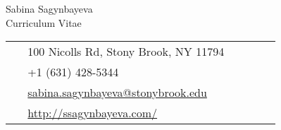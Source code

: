 \documentclass[10pt]{article} %
\begin{document}
\begin{paracol}{2}

\parbox[top][0.12\textheight][c]{\linewidth}{ %
	\vspace{-0.04\textheight} %
	\centering %
	{\sffamily\Huge Sabina Sagynbayeva}\\\medskip %
	{\Huge\color{headings}\cvtextfont Curriculum Vitae}
}
\switchcolumn %

\parbox[top][0.12\textheight][c]{\linewidth}{ %
	\vspace{-0.04\textheight} %
	\colorbox{shade}{ %
		\begin{supertabular}{p{0.05\linewidth}|p{0.775\linewidth}} %
			\raisebox{-1pt}{\faHome} & 100 Nicolls Rd, Stony Brook, NY 11794 \\ %
			\raisebox{-1pt}{\faPhone} & +1 (631) 428-5344 \\ %
			\raisebox{0pt}{\small\faEnvelope} & \href{mailto:sabina.sagynbayeva@stonybrook.edu}{sabina.sagynbayeva@stonybrook.edu} \\ %
			\raisebox{-1pt}{\small\faDesktop} & \href{http://ssagynbayeva.com/}{http://ssagynbayeva.com/} \\ %
		\end{supertabular}
	}
}
\end{paracol}
\end{document}
